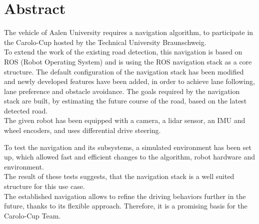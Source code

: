 \chapter*{Abstract}
\label{abstract}

The vehicle of Aalen University requires a navigation algorithm, to participate in the Carolo-Cup hosted by the Technical University Braunschweig.\\

To extend the work of the existing road detection, this navigation is based on ROS (Robot Operating System) and is using the ROS navigation stack as a core structure. The default configuration of the navigation stack has been modified and newly developed features have been added, in order to achieve lane following, lane preference and obstacle avoidance.
The goals required by the navigation stack are built, by estimating the future course of the road, based on the latest detected road.\\

The given robot has been equipped with a camera, a lidar sensor, an IMU and wheel encoders, and uses differential drive steering.

To test the navigation and its subsystems, a simulated environment has been set up, which allowed fast and efficient changes to the algorithm, robot hardware and environment.\\

The result of these tests suggests, that the navigation stack is a well suited structure for this use case.\\

The established navigation allows to refine the driving behaviors further  in the future, thanks to its flexible approach. Therefore, it is a promising basis for the Carolo-Cup Team.

